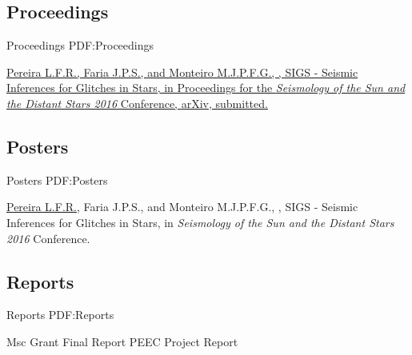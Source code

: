 \documentclass[letterpaper,10pt,oneside]{article}
\begin{document}
\begin{body}


\subsection
{Proceedings}
{Proceedings}
{PDF:Proceedings}

\GapNoBreak
{}
\href{}
{\underline{Pereira L.F.R.}, Faria J.P.S., and Monteiro M.J.P.F.G., 
, 
SIGS - Seismic Inferences for Glitches in Stars,
in Proceedings for the \textit{Seismology of the Sun and the Distant Stars 2016} Conference, \href{http://arxiv.org/abs/1703.04828} {arXiv}, submitted.}

\BigGap
\subsection
{Posters}
{Posters}
{PDF:Posters}

{\underline{Pereira L.F.R.}, Faria J.P.S., and Monteiro M.J.P.F.G., 
, 
SIGS - Seismic Inferences for Glitches in Stars,
in \textit{Seismology of the Sun and the Distant Stars 2016} Conference.}

\BigGap
\subsection
{Reports}
{Reports}
{PDF:Reports}

Msc Grant Final Report
PEEC Project Report




\end{body}
\end{document}

